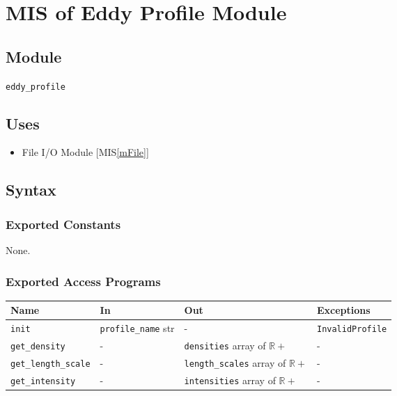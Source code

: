 \documentclass[12pt, titlepage]{article}
\begin{document}
\newpage
\section{MIS of Eddy Profile Module} \label{mProf} 

\subsection{Module}
\texttt{eddy\_profile}

\subsection{Uses}
\begin{itemize}
\item File I/O Module [MIS\ref{mFile}]
\end{itemize}

\subsection{Syntax}

\subsubsection{Exported Constants}
None.

\subsubsection{Exported Access Programs}

\begin{center}
\begin{tabular}{p{3.2cm} p{3.5cm} p{5cm} p{3cm}}
\hline
\textbf{Name} & \textbf{In} & \textbf{Out} & \textbf{Exceptions} \\
\hline
\texttt{init} & \texttt{profile\_name} str & - & \texttt{InvalidProfile} \\
\texttt{get\_density}& - & \texttt{densities} array of $\mathbb{R+}$ & - \\
\texttt{get\_length\_scale}& - & \texttt{length\_scales} array of $\mathbb{R+}$ & - \\
\texttt{get\_intensity}& - & \texttt{intensities} array of $\mathbb{R+}$ & - \\
\hline
\end{tabular}
\end{center}
\end{document}

